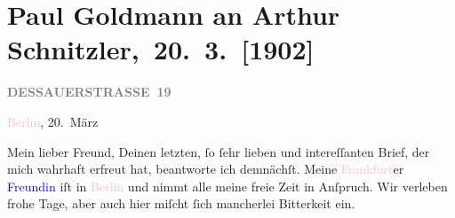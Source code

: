 

\renewcommand{\erwaehntePersonen}{Personen: Richard Beer-Hofmann, Theodore Rottenberg, Olga Schnitzler}
\renewcommand{\erwaehnteInstitutionen}{Institutionen: Houghton Library}
\renewcommand{\erwaehnteOrte}{Orte: Berlin, Dessauer Straße, Frankfurt am Main, Prag, Wien}
\renewcommand{\erwaehnteWerke}{}
\section[ Paul Goldmann an Arthur Schnitzler, 20. 3. {[}1902{]}]{Paul Goldmann an Arthur Schnitzler, 20. 3. {[}1902{]}}
\nopagebreak{}
\rehead{ }\normalsize\beginnumbering{}
\toendnotes[C]{\smallbreak\pagebreak[2]}
\toendnotes[C]{\smallbreak}
\pstart
           \noindent{}\raggedleft{}{\pb}\textcolor{pink}{\textcolor{gray}{\textbf{DESSAUERSTRASSE 19}}}{}\ledrightnote{\textcolor{pink}{Dessauer Straße}}\pend
           
\pstart
           \textcolor{pink}{Berlin}{}\ledrightnote{\textcolor{pink}{Berlin}}, 20. März\pend
           
\pstart{}Mein lieber Freund,\pend
\pstart
           Deinen letzten, ſo ſehr lieben und intereſſanten Brief, der mich wahrhaft erfreut
               hat, beantworte ich demnächſt. Meine \textcolor{pink}{Frankfurt}{}\ledrightnote{\textcolor{pink}{Frankfurt am Main}}er
                  \textcolor{blue}{Freundin}{}\ledrightnote{\textcolor{blue}{Theodore Rottenberg}} iſt in \textcolor{pink}{Berlin}{}\ledrightnote{\textcolor{pink}{Berlin}} und nimmt alle meine freie Zeit in Anſpruch. Wir
               verleben frohe Tage, aber auch hier miſcht ſich mancherlei Bitterkeit ein.\pend
           
